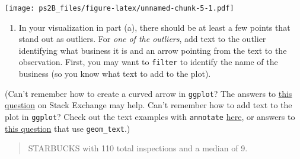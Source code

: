 \documentclass[
]{article}
\providecommand{\tightlist}{%
  \setlength{\itemsep}{0pt}\setlength{\parskip}{0pt}}
\begin{document}
\texttt{[image: ps2B\_files/figure-latex/unnamed-chunk-5-1.pdf]}

\begin{enumerate}
\def\labelenumi{\alph{enumi}.}
\setcounter{enumi}{1}
\tightlist
\item
  In your visualization in part (a), there should be at least a few
  points that stand out as outliers. For \emph{one of the outliers}, add
  text to the outlier identifying what business it is and an arrow
  pointing from the text to the observation. First, you may want to
  \texttt{filter} to identify the name of the business (so you know what
  text to add to the plot).
\end{enumerate}

(Can't remember how to create a curved arrow in \texttt{ggplot}? The
answers to
\href{https://stackoverflow.com/questions/38008863/how-to-draw-a-nice-arrow-in-ggplot2/61383034}{this
question} on Stack Exchange may help. Can't remember how to add text to
the plot in \texttt{ggplot}? Check out the text examples with
\texttt{annotate}
\href{https://ggplot2.tidyverse.org/reference/annotate.html}{here}, or
answers to
\href{https://stackoverflow.com/questions/14351608/color-one-point-and-add-an-annotation-in-ggplot2/14351810}{this
question} that use \texttt{geom\_text}.)

\begin{quote}
STARBUCKS with 110 total inspections and a median of 9.
\end{quote}
\end{document}
